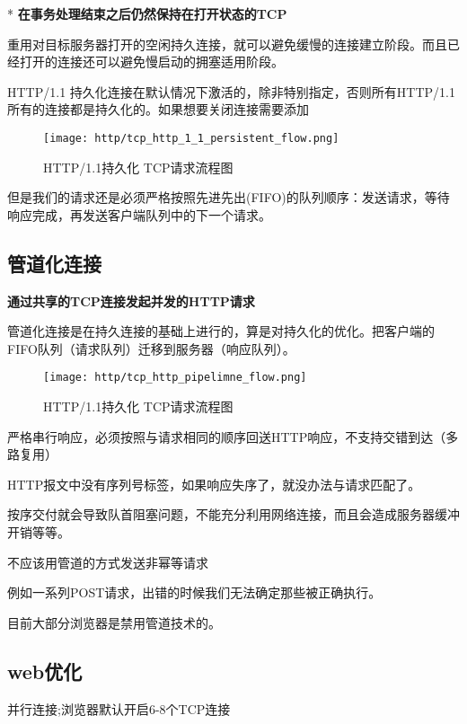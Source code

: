 * \textbf{在事务处理结束之后仍然保持在打开状态的TCP}

重用对目标服务器打开的空闲持久连接，就可以避免缓慢的连接建立阶段。而且已经打开的连接还可以避免慢启动的拥塞适用阶段。

HTTP/1.1 持久化连接在默认情况下激活的，除非特别指定，否则所有HTTP/1.1所有的连接都是持久化的。如果想要关闭连接需要添加 

\begin{figure}[H]
    \centering
    \texttt{[image: http/tcp\_http\_1\_1\_persistent\_flow.png]}
    \caption{HTTP/1.1持久化 TCP请求流程图}
\end{figure}


但是我们的请求还是必须严格按照先进先出(FIFO)的队列顺序：发送请求，等待响应完成，再发送客户端队列中的下一个请求。


\subsection{管道化连接}

\textbf{通过共享的TCP连接发起并发的HTTP请求}

管道化连接是在持久连接的基础上进行的，算是对持久化的优化。把客户端的FIFO队列（请求队列）迁移到服务器（响应队列）。


\begin{figure}[H]
    \centering
    \texttt{[image: http/tcp\_http\_pipelimne\_flow.png]}
    \caption{HTTP/1.1持久化 TCP请求流程图}
\end{figure}

严格串行响应，必须按照与请求相同的顺序回送HTTP响应，不支持交错到达（多路复用）

\qquad    HTTP报文中没有序列号标签，如果响应失序了，就没办法与请求匹配了。


按序交付就会导致队首阻塞问题，不能充分利用网络连接，而且会造成服务器缓冲开销等等。

不应该用管道的方式发送非幂等请求

\qquad   例如一系列POST请求，出错的时候我们无法确定那些被正确执行。


目前大部分浏览器是禁用管道技术的。





\subsection{web优化}

并行连接;浏览器默认开启6-8个TCP连接

